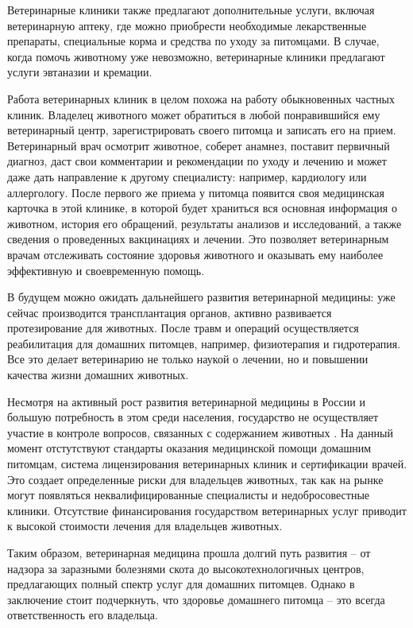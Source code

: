 \documentclass[a4paper]{article}
\begin{document}
Ветеринарные клиники также предлагают дополнительные услуги, включая ветеринарную аптеку, где можно приобрести необходимые лекарственные препараты, специальные корма и средства по уходу за питомцами. В случае, когда помочь животному уже невозможно, ветеринарные клиники предлагают услуги эвтаназии и кремации.

Работа ветеринарных клиник в целом похожа на работу обыкновенных частных клиник. Владелец животного может обратиться в любой понравившийся ему ветеринарный центр, зарегистрировать своего питомца и записать его на прием. Ветеринарный врач осмотрит животное, соберет анамнез, поставит первичный диагноз, даст свои комментарии и рекомендации по уходу и лечению и может даже дать направление к другому специалисту: например, кардиологу или аллергологу. После первого же приема у питомца появится своя медицинская карточка в этой клинике, в которой будет храниться вся основная информация о животном, история его обращений, результаты анализов и исследований, а также сведения о проведенных вакцинациях и лечении. Это позволяет ветеринарным врачам отслеживать состояние здоровья животного и оказывать ему наиболее эффективную и своевременную помощь.

В будущем можно ожидать дальнейшего развития ветеринарной медицины: уже сейчас производится трансплантация органов, активно развивается протезирование для животных.  После травм и операций осуществляется реабилитация для домашних питомцев, например, физиотерапия и гидротерапия. Все это делает ветеринарию не только наукой  о лечении, но и повышении качества жизни домашних животных. 

Несмотря на активный рост развития ветеринарной медицины в России и большую потребность в этом среди населения, государство не осуществляет участие в контроле вопросов, связанных с содержанием животных \cite{civilcode}. На данный момент отстутствуют стандарты оказания медицинской помощи домашним питомцам, система лицензирования ветеринарных клиник и сертификации врачей. Это создает определенные риски для владельцев животных, так как на рынке могут появляться неквалифицированные специалисты и недобросовестные клиники. Отсутствие финансирования государством ветеринарных услуг приводит к высокой стоимости лечения для владельцев животных. 

Таким образом, ветеринарная медицина прошла долгий путь развития – от надзора за заразными болезнями скота до высокотехнологичных центров, предлагающих полный спектр услуг для домашних питомцев. Однако в заключение стоит подчеркнуть, что здоровье домашнего питомца – это всегда ответственность его владельца.
\end{document}
